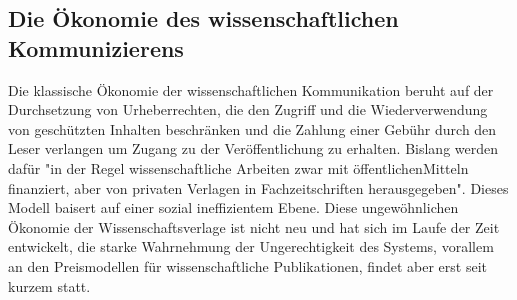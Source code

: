 \subsection{Die Ökonomie des wissenschaftlichen Kommunizierens}
Die klassische Ökonomie der wissenschaftlichen Kommunikation beruht auf der Durchsetzung von Urheberrechten, die den Zugriff und die Wiederverwendung von geschützten Inhalten beschränken und die Zahlung einer Gebühr durch den Leser verlangen um Zugang zu der Veröffentlichung zu erhalten.\cite{CREATe_2014} Bislang werden dafür "in der Regel wissenschaftliche Arbeiten zwar mit öffentlichenMitteln finanziert, aber von privaten Verlagen in Fachzeitschriften herausgegeben"\cite{WD_bundestag_2009}. Dieses Modell baisert auf einer sozial ineffizientem Ebene\cite{mueller-langer_2010}. Diese ungewöhnlichen Ökonomie der Wissenschaftsverlage ist nicht neu und hat sich im Laufe der Zeit entwickelt, die starke Wahrnehmung der Ungerechtigkeit des Systems, vorallem an den Preismodellen für wissenschaftliche Publikationen\cite{King_2008}, findet aber erst seit kurzem statt\cite{CREATe_2014}.

